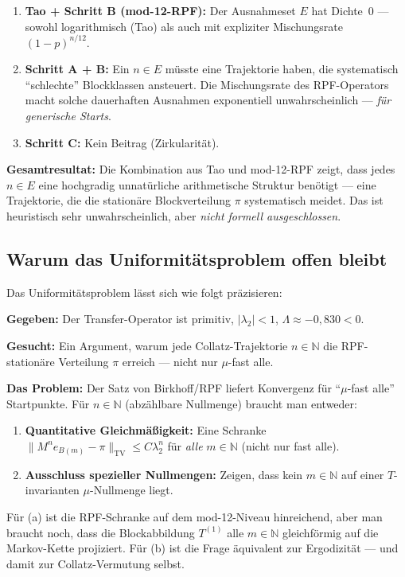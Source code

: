 \documentclass[12pt,a4paper]{article}
\newcommand{\N}{\mathbb{N}}
\newcommand{\TV}{\mathrm{TV}}
\begin{document}
\begin{tcolorbox}[kernidee, title={Gesamtbild: Was gezeigt werden kann}]
\begin{enumerate}[label=(\arabic*)]
  \item \textbf{Tao + Schritt B (mod-12-RPF):} Der Ausnahmeset $E$
    hat Dichte~$0$ --- sowohl logarithmisch (Tao) als auch mit
    expliziter Mischungsrate $(1-p)^{n/12}$.
  \item \textbf{Schritt A + B:} Ein $n \in E$ müsste eine Trajektorie haben,
    die systematisch ``schlechte'' Blockklassen ansteuert. Die
    Mischungsrate des RPF-Operators macht solche dauerhaften Ausnahmen
    exponentiell unwahrscheinlich --- \emph{für generische Starts}.
  \item \textbf{Schritt C:} Kein Beitrag (Zirkularität).
\end{enumerate}

\medskip
\textbf{Gesamtresultat:} Die Kombination aus Tao und mod-12-RPF zeigt,
dass jedes $n \in E$ eine hochgradig unnatürliche arithmetische Struktur
benötigt --- eine Trajektorie, die die stationäre Blockverteilung $\pi$
systematisch meidet. Das ist heuristisch sehr unwahrscheinlich, aber
\emph{nicht formell ausgeschlossen}.
\end{tcolorbox}

\subsection{Warum das Uniformitätsproblem offen bleibt}

\begin{tcolorbox}[lücke, title={Die unüberbrückte Lücke}]
Das Uniformitätsproblem lässt sich wie folgt präzisieren:

\medskip
\textbf{Gegeben:} Der Transfer-Operator ist primitiv, $|\lambda_2| < 1$,
$\Lambda \approx -0{,}830 < 0$.

\medskip
\textbf{Gesucht:} Ein Argument, warum jede Collatz-Trajektorie
$n \in \N$ die RPF-stationäre Verteilung $\pi$ erreich --- nicht nur
$\mu$-fast alle.

\medskip
\textbf{Das Problem:} Der Satz von Birkhoff/RPF liefert Konvergenz
für ``$\mu$-fast alle'' Startpunkte. Für $n \in \N$ (abzählbare
Nullmenge) braucht man entweder:
\begin{enumerate}[label=(\alph*), nosep]
  \item \textbf{Quantitative Gleichmäßigkeit:} Eine Schranke
    $\|M^n e_{B(m)} - \pi\|_{\TV} \leq C\lambda_2^n$ für
    \emph{alle} $m \in \N$ (nicht nur fast alle).
  \item \textbf{Ausschluss spezieller Nullmengen:} Zeigen, dass kein
    $m \in \N$ auf einer $T$-invarianten $\mu$-Nullmenge liegt.
\end{enumerate}
Für (a) ist die RPF-Schranke auf dem mod-12-Niveau hinreichend, aber
man braucht noch, dass die Blockabbildung $T^{(1)}$ alle
$m \in \N$ gleichförmig auf die Markov-Kette projiziert.
Für (b) ist die Frage äquivalent zur Ergodizität --- und damit
zur Collatz-Vermutung selbst.
\end{tcolorbox}
\end{document}
